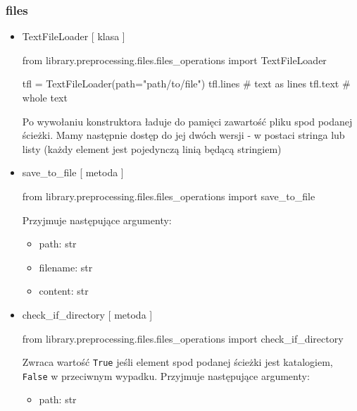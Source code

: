 \subsubsection{files}

\myspace
{}
\myspace

\begin{itemize}

\item{TextFileLoader [ klasa ] }

\begin{python}
from library.preprocessing.files.files_operations import TextFileLoader

tfl = TextFileLoader(path="path/to/file")
tfl.lines  # text as lines
tfl.text   # whole text
\end{python}

Po wywołaniu konstruktora ładuje do pamięci zawartość pliku spod podanej ścieżki. Mamy następnie 
dostęp do jej dwóch wersji - w postaci stringa lub listy (każdy element jest pojedynczą 
linią będącą stringiem)

\item{save\_to\_file [ metoda ] }
\begin{import}
from library.preprocessing.files.files_operations import save_to_file
\end{import}

Przyjmuje następujące argumenty:
\begin{itemize}
	\item path: str
	\item filename: str
	\item content: str
\end{itemize}

\item{check\_if\_directory [ metoda ] }
\begin{import}
from library.preprocessing.files.files_operations import check_if_directory
\end{import}
Zwraca wartość \texttt{True} jeśli element spod podanej ścieżki jest katalogiem, \texttt{False} w przeciwnym wypadku.
Przyjmuje następujące argumenty:
\begin{itemize}
	\item path: str
\end{itemize}


\end{itemize}
